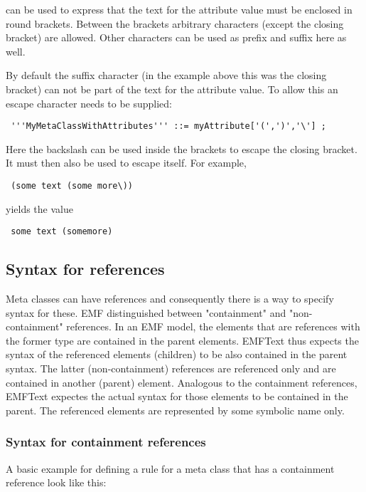 can be used to express that the text for the attribute value must be enclosed in round brackets. Between the brackets arbitrary characters (except the closing bracket) are allowed. Other characters can be used as prefix and suffix here as well.

By default the suffix character (in the example above this was the closing bracket) can not be part of the text for the attribute value. To allow this an escape character needs to be supplied:

\begin{lstlisting}
 '''MyMetaClassWithAttributes''' ::= myAttribute['(',')','\'] ;
\end{lstlisting}

Here the backslash can be used inside the brackets to escape the closing bracket. It must then also be used to escape itself. For example,

\begin{lstlisting}
 (some text (some more\))
\end{lstlisting}

yields the value 
 
\begin{lstlisting}
 some text (somemore)
\end{lstlisting}

\subsection{Syntax for references}

Meta classes can have references and consequently there is a way to specify syntax for these. EMF distinguished between "containment" and "non-containment" references. In an EMF model, the elements that are references with the former type are contained in the parent elements. EMFText thus expects the syntax of the referenced elements (children) to be also contained in the parent syntax. The latter (non-containment) references are referenced only and are contained in another (parent) element. Analogous to the containment references, EMFText expectes the actual syntax for those elements to be contained in the parent. The referenced elements are represented by some symbolic name only.

\subsubsection{Syntax for containment references}

A basic example for defining a rule for a meta class that has a containment reference look like this:

